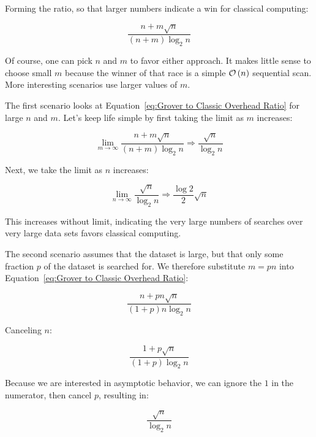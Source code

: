 Forming the ratio, so that larger numbers indicate a win for classical
computing:

\begin{equation}
	\frac{n + m \sqrt n}{\left( n + m \right) \log_2 n}
\label{eq:Grover to Classic Overhead Ratio}
\end{equation}

Of course, one can pick $n$ and $m$ to favor either approach.
It makes little sense to choose small $m$ because the winner of that
race is a simple $\mathcal{O}\left(n\right)$ sequential scan.
More interesting scenarios use larger values of $m$.

The first scenario looks at
Equation~\ref{eq:Grover to Classic Overhead Ratio}
for large $n$ and $m$.
Let's keep life simple by first taking the limit as $m$ increases:

\begin{equation}
	\lim_{m\to\infty} \frac{n + m \sqrt n}{\left( n + m \right) \log_2 n}
	\Rightarrow \frac{\sqrt n}{\log_2 n}
\label{eq:sqrt n by log 2 n}
\end{equation}

Next, we take the limit as $n$ increases:

\begin{equation}
	\lim_{n\to\infty} \frac{\sqrt n}{\log_2 n}
	\Rightarrow \frac{\log 2}{2} \sqrt n
\end{equation}

This increases without limit, indicating the very large numbers of searches
over very large data sets favors classical computing.

The second scenario assumes that the dataset is large, but that only
some fraction $p$ of the dataset is searched for.
We therefore substitute $m = pn$ into
Equation~\ref{eq:Grover to Classic Overhead Ratio}:

\begin{equation}
	\frac{n + p n \sqrt n}{\left( 1 + p \right) n \log_2 n}
\end{equation}

Canceling $n$:

\begin{equation}
	\frac{1 + p \sqrt n}{\left( 1 + p \right) \log_2 n}
\end{equation}

Because we are interested in asymptotic behavior, we can ignore the
$1$ in the numerator, then cancel $p$, resulting in:

\begin{equation}
	\frac{\sqrt n}{\log_2 n}
\end{equation}

